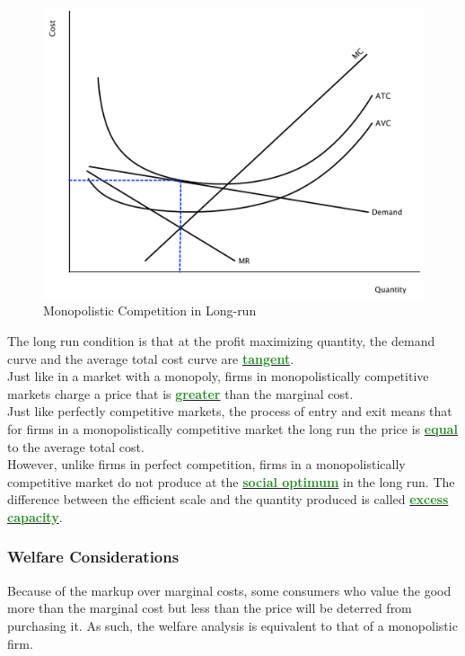 \documentclass[11pt]{article}\usepackage[]{graphicx}\usepackage[]{color}
\theoremstyle{definition}
\newcommand{\dd}[1]{{\underline{\textbf{\textcolor{ForestGreen}{#1}}}}}
\begin{document}
	\begin{figure}[H]
		\centering
		\includegraphics[scale=.40]{plot81.pdf}
		\caption{Monopolistic Competition in Long-run}
	\end{figure}
	
	The long run condition is that at the profit maximizing quantity, the demand curve and the average total cost curve are \dd{tangent}.
	\\
	
	Just like in a market with a monopoly, firms in monopolistically competitive markets charge a price that is \dd{greater} than the marginal cost. 
	\\
	
	Just like perfectly competitive markets, the process of entry and exit means that for firms in a monopolistically competitive market the long run the price is \dd{equal} to the average total cost. 
	\\
	
	However, unlike firms in perfect competition, firms in a monopolistically competitive market do not produce at the \dd{social optimum} in the long run. The difference between the efficient scale and the quantity produced is called \dd{excess capacity}.
	
	\subsubsection*{Welfare Considerations}  
	
	Because of the markup over marginal costs, some consumers who value the good more than the marginal cost but less than the price will be deterred from purchasing it. As such, the welfare analysis is equivalent to that of a monopolistic firm.
	
\end{document}
